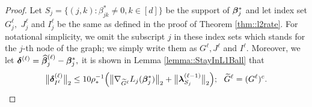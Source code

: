\documentclass[twoside,11pt]{article}
\newcommand*{\bbetas}{\bbeta^*}
\newcommand*{\hbbetas}{\hat{\bbeta}_{j}}
\newcommand*{\bbetass}{\bbeta^*_{j}}
\begin{document}
\begin{proof} 
Let $S_j = \{ (j,k) \colon \beta_{jk}^* \neq 0,k\!\in\![d]\}$ be the support of $\bbetass$ and let index set $G_{j}^\ell,$ $J_{j}^\ell$ and $I_{j}^\ell$ be the same  as defined in the proof of Theorem \ref{thm::l2rate}. For notational simplicity, we omit the subscript $j$ in these index sets which stands for the $j$-th node of the graph; we simply write them as $G^{\ell}, J^{\ell}$ and $I^{\ell}.$  Moreover, we  let $\bdelta^{(\ell)} = \hbbetas^{(\ell)} - \bbetass,$
it is shown in Lemma \ref{lemma::StayInL1Ball}  that 
\begin{align}\label{equ::RefinedBound1}
\bigl\| \bdelta_{I^{\ell}}^{(\ell)}\bigr \|_2 \leq 10\rho _*^{-1}\Bigl (\bigl\|\nabla _{\tilde G^\ell} L_j(\bbetas_j)  \bigr\|_2 + \bigl\|\blambda_{S_j}^{(\ell-1)}\bigr\|_2 \Bigr); ~~\tilde G^\ell = (G^\ell)^c.
\end{align} 


\end{proof}
\end{document}
